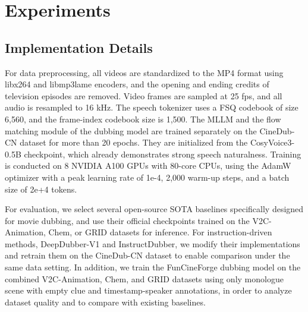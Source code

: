 \documentclass{article}
\begin{document}
\section{Experiments}
\subsection{Implementation Details}
For data preprocessing, all videos are standardized to the MP4 format using libx264 and libmp3lame encoders,
and the opening and ending credits of television episodes are removed.
Video frames are sampled at 25 fps, and all audio is resampled to 16 kHz.
The speech tokenizer uses a FSQ codebook of size 6,560, and the frame-index codebook size is 1,500.
The MLLM and the flow matching module of the dubbing model are trained separately on the CineDub-CN dataset for more than 20 epochs.
They are initialized from the CosyVoice3-0.5B checkpoint, which already demonstrates strong speech naturalness.
Training is conducted on 8 NVIDIA A100 GPUs with 80-core CPUs,
using the AdamW optimizer with a peak learning rate of 1e-4, 2,000 warm-up steps, 
and a batch size of 2e+4 tokens.

For evaluation, we select several open-source SOTA baselines specifically designed for movie dubbing,
and use their official checkpoints trained on the V2C-Animation, Chem, or GRID datasets for inference.
For instruction-driven methods, DeepDubber-V1 and InstructDubber,
we modify their implementations and retrain them on the CineDub-CN dataset to enable comparison under the same data setting.
In addition, we train the FunCineForge dubbing model on the combined V2C-Animation, Chem, and GRID datasets 
using only monologue scene with empty clue and timestamp-speaker annotations, 
in order to analyze dataset quality and to compare with existing baselines.
\end{document}
